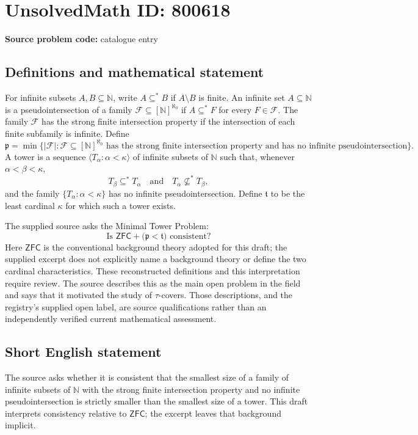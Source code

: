 \documentclass[11pt]{article}
\newcommand{\N}{\mathbb{N}}
\begin{document}
\section*{UnsolvedMath ID: 800618}
\textbf{Source problem code:} catalogue entry
\subsection{Definitions and mathematical statement}
For infinite subsets \(A,B\subseteq\N\), write \(A\subseteq^{*}B\) if \(A\setminus B\) is finite. An infinite set \(A\subseteq\N\) is a pseudointersection of a family \(\mathcal F\subseteq[\N]^{\aleph_0}\) if \(A\subseteq^{*}F\) for every \(F\in\mathcal F\). The family \(\mathcal F\) has the strong finite intersection property if the intersection of each finite subfamily is infinite. Define
\[
\mathfrak p=\min\bigl\{|\mathcal F|:\mathcal F\subseteq[\N]^{\aleph_0}\text{ has the strong finite intersection property and has no infinite pseudointersection}\bigr\}.
\]
A tower is a sequence \(\langle T_\alpha:\alpha<\kappa\rangle\) of infinite subsets of \(\N\) such that, whenever \(\alpha<\beta<\kappa\),
\[
T_\beta\subseteq^{*}T_\alpha
\quad\text{and}\quad
T_\alpha\not\subseteq^{*}T_\beta,
\]
and the family \(\{T_\alpha:\alpha<\kappa\}\) has no infinite pseudointersection. Define \(\mathfrak t\) to be the least cardinal \(\kappa\) for which such a tower exists.

The supplied source asks the Minimal Tower Problem:
\[
\text{Is }\mathsf{ZFC}+\bigl(\mathfrak p<\mathfrak t\bigr)\text{ consistent?}
\]
Here \(\mathsf{ZFC}\) is the conventional background theory adopted for this draft; the supplied excerpt does not explicitly name a background theory or define the two cardinal characteristics. These reconstructed definitions and this interpretation require review. The source describes this as the main open problem in the field and says that it motivated the study of \(\tau\)-covers. Those descriptions, and the registry's supplied open label, are source qualifications rather than an independently verified current mathematical assessment.
\subsection{Short English statement}
The source asks whether it is consistent that the smallest size of a family of infinite subsets of \(\N\) with the strong finite intersection property and no infinite pseudointersection is strictly smaller than the smallest size of a tower. This draft interprets consistency relative to \(\mathsf{ZFC}\); the excerpt leaves that background implicit.
\end{document}
